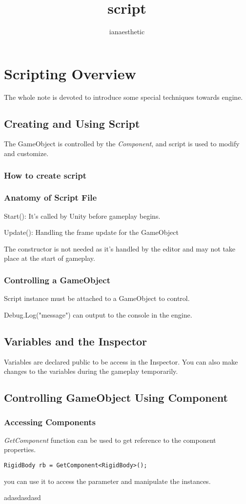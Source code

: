 \documentclass[a4paper, 12pt]{article}
\title{script}
\author{ianaesthetic}
\begin{document}
    \section{Scripting Overview}
        The whole note is devoted to introduce some special techniques towards engine. 
        \subsection{Creating and Using Script}
            The GameObject is controlled by the \emph{Component}, and script is used to modify and customize. 
            \subsubsection{How to create script}
            \subsubsection{Anatomy of Script File}
                Start(): It's called by Unity before gameplay begins.
                
                Update(): Handling the frame update for the GameObject
                
                The constructor is not needed as it's handled by the editor and may not take place at the start of gameplay. 

            \subsubsection{Controlling a GameObject}
                Script instance must be attached to a GameObject to control. 

                Debug.Log("message") can output to the console in the engine. 
            
        \subsection{Variables and the Inspector}
            Variables are declared public to be access in the Inspector. You can also make changes to the variables during the gameplay temporarily. 
        \subsection{Controlling GameObject Using Component}
            \subsubsection{Accessing Components}
                \emph{GetComponent} function can be used to get reference to the component properties. 
\begin{lstlisting}
RigidBody rb = GetComponent<RigidBody>(); 
\end{lstlisting}
                you can use it to access the parameter and manipulate the instances.

adasdasdasd 
\end{document}
